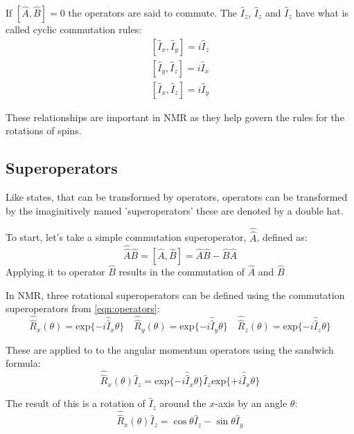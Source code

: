 If $[\hat{A},\hat{B}] = 0$ the operators are said to commute. The $\hat{I}_z$, $\hat{I}_z$ and $\hat{I}_z$
have what is called cyclic commutation rules:
\begin{align}\label{eqn:commutator}
  [\hat{I}_x,\hat{I}_y] = i\hat{I}_z\\
  [\hat{I}_y,\hat{I}_z] = i\hat{I}_x\\
  [\hat{I}_x,\hat{I}_z] = i\hat{I}_y
\end{align}

These relationships are important in NMR as they help govern the rules for the rotations of spins.

\subsection{Superoperators}

Like states, that can be transformed by operators, operators can be transformed by the imaginitively
named 'superoperators' these are denoted by a double hat.

To start, let's take a simple commutation superoperator, $\hat{\hat{A}}$, defined as:
\begin{equation}
  \hat{\hat{A}}\hat{B} = [\hat{A},\hat{B}] = \hat{A}\hat{B} - \hat{B}\hat{A}
\end{equation}
Applying it to operator $\hat{B}$ results in the commutation of $\hat{A}$ and $\hat{B}$

In NMR, three rotational superoperators can be defined using the commutation superoperators from \ref{eqn:operators}:
\begin{equation}
 \hat{\hat{R}}_x(\theta) = \text{exp}\{-i\hat{\hat{I}}_x\theta\}\quad\hat{\hat{R}}_y(\theta) = \text{exp}\{-i\hat{\hat{I}}_y\theta\}\quad\hat{\hat{R}}_z(\theta) = \text{exp}\{-i\hat{\hat{I}}_z\theta\}
\end{equation}

These are applied to to the angular momentum operators using the sandwich formula:
\begin{equation}
  \hat{\hat{R}}_x(\theta)\hat{I}_z = \text{exp}\{-i\hat{\hat{I}}_x\theta\}\hat{I}_z\text{exp}\{+i\hat{\hat{I}}_x\theta\}
\end{equation}

The result of this is a rotation of $\hat{I}_z$ around the $x$-axis by an angle $\theta$:
\begin{equation}
  \hat{\hat{R}}_x(\theta)\hat{I}_z = \cos{\theta}\hat{I}_z - \sin{\theta}\hat{I}_y
\end{equation}

